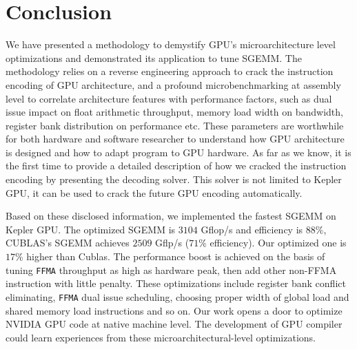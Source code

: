\section{Conclusion}
\label{sec:conclusion}
We have presented a methodology to demystify GPU's microarchitecture level optimizations and demonstrated its 
application to tune SGEMM. The methodology relies on a reverse engineering approach to crack the instruction encoding 
of GPU architecture, and a profound microbenchmarking at assembly level to correlate architecture features with 
performance factors, such as dual issue impact on float arithmetic throughput, memory load width on bandwidth, register 
bank distribution on performance etc. These parameters are worthwhile for both hardware and software researcher to 
understand how GPU architecture is designed and how to adapt program to GPU hardware. As far as we know, it is the 
first time to provide a detailed description of how we cracked the instruction encoding by presenting the decoding 
solver. This solver is not limited to Kepler GPU, it can be used to crack the future GPU encoding automatically.

Based on these disclosed information, we implemented the fastest SGEMM on Kepler GPU. The optimized SGEMM is $3104$ 
Gflop/s and efficiency is $88\%$, CUBLAS's SGEMM achieves $2509$ Gflp/s ($71\%$ efficiency). Our optimized one is 
$17\%$ higher than Cublas. The performance boost is achieved on the basis of tuning {\tt FFMA} throughput as high as 
hardware peak, then add other non-FFMA instruction with little penalty. These optimizations include register bank 
conflict eliminating, {\tt FFMA} dual issue scheduling, choosing proper width of global load and shared memory load 
instructions and so on. Our work opens a door to optimize NVIDIA GPU code at native machine level. The development of 
GPU compiler could learn experiences from these microarchitectural-level optimizations.

